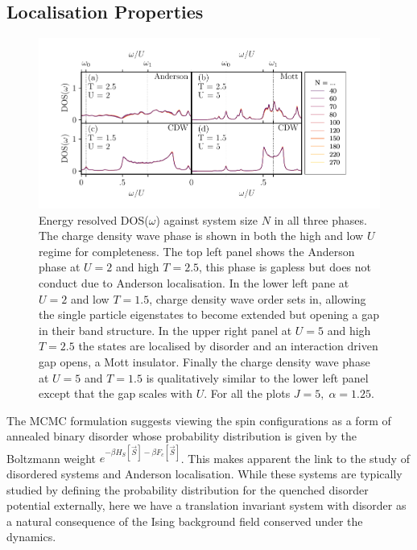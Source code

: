 \hypertarget{localisation-properties}{%
\subsection{Localisation Properties}\label{localisation-properties}}

\hypertarget{fig:DOS}{%
\begin{figure}
\centering
\includegraphics[width=1\textwidth,height=\textheight]{figure_code/fk_chapter/DOS/DOS}
\caption[{Energy resolved DOS(\(\omega\)) in the difference phases.}]{Energy resolved DOS(\(\omega\)) against system size \(N\) in all three phases. The charge density wave phase is shown in both the high and low \(U\) regime for completeness. The top left panel shows the Anderson phase at \(U = 2\) and high \(T = 2.5\), this phase is gapless but does not conduct due to Anderson localisation. In the lower left pane at \(U = 2\) and low \(T = 1.5\), charge density wave order sets in, allowing the single particle eigenstates to become extended but opening a gap in their band structure. In the upper right panel at \(U = 5\) and high \(T = 2.5\) the states are localised by disorder and an interaction driven gap opens, a Mott insulator. Finally the charge density wave phase at \(U = 5\) and \(T = 1.5\) is qualitatively similar to the lower left panel except that the gap scales with \(U\). For all the plots \(J = 5,\;\alpha = 1.25\).}
\label{fig:DOS}
\end{figure}
}

The MCMC formulation suggests viewing the spin configurations as a form of annealed binary disorder whose probability distribution is given by the Boltzmann weight \(e^{-\beta H_S[\vec{S}] - \beta F_c[\vec{S}]}\). This makes apparent the link to the study of disordered systems and Anderson localisation. While these systems are typically studied by defining the probability distribution for the quenched disorder potential externally, here we have a translation invariant system with disorder as a natural consequence of the Ising background field conserved under the dynamics.

